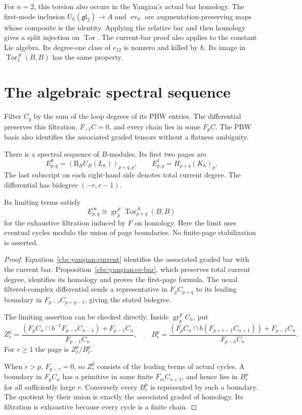 For $n=2$, this torsion also occurs in the Yangian's actual bar homology.
The first-mode inclusion
$U_\hbar(\mathfrak{gl}_2)\longrightarrow A$ and
$\operatorname{ev}_0$ are augmentation-preserving maps whose composite
is the identity.  Applying the relative bar and then homology gives
a split injection on $\operatorname{Tor}$.  The current-bar proof also
applies to the constant Lie algebra.  Its degree-one class of $e_{12}$
is nonzero and killed by $\hbar$.  Its image in
$\operatorname{Tor}^A_1(B,B)$ has the same property.

\section{The algebraic spectral sequence}

Filter $C_q$ by the sum of the loop degrees of its PBW entries.
The differential preserves this filtration, $F_{-1}C=0$, and every
chain lies in some $F_pC$.  The PBW basis also identifies the associated
graded tensors without a flatness ambiguity.

\begin{theorem}\label{thm:yangian-bar-ss}
There is a spectral sequence of $B$-modules.  Its first two pages are
\[
 E^0_{p,q}=(\mathrm B_B U_B(L_\hbar))_{p+q,p},\qquad
 E^1_{p,q}=H_{p+q}(K_\hbar)_p.
\]
The last subscript on each right-hand side denotes total current degree.
The differential has bidegree $(-r,r-1)$.

Its limiting terms satisfy
\[
 E^\infty_{p,q}
 \cong\operatorname{gr}^F_p\operatorname{Tor}^A_{p+q}(B,B)
\]
for the exhaustive filtration induced by $F$ on homology.
Here the limit uses eventual cycles modulo the union of page boundaries.
No finite-page stabilization is asserted.
\end{theorem}
\begin{proof}
Equation~\eqref{cbc:yangian:current} identifies the associated graded
bar with the current bar.  Proposition~\ref{cbc:yangian:ce-bar}, which
preserves total current degree, identifies its homology and proves the
first-page formula.  The usual filtered-complex differential sends a
representative in $F_pC_{p+q}$ to its leading boundary in
$F_{p-r}C_{p+q-1}$, giving the stated bidegree.

The limiting assertion can be checked directly.  Inside
$\operatorname{gr}_p^F C_n$, put
\[
 Z_r^p=\frac{(F_pC_n\cap b^{-1}F_{p-r}C_{n-1})+F_{p-1}C_n}
                  {F_{p-1}C_n},\qquad
 B_r^p=\frac{(F_pC_n\cap b(F_{p+r-1}C_{n+1}))+F_{p-1}C_n}
                  {F_{p-1}C_n}.
\]
For $r\geq1$ the page is $Z_r^p/B_r^p$.

When $r>p$, $F_{p-r}=0$, so $Z_r^p$ consists of the leading terms of
actual cycles.  A boundary in $F_pC_n$ has a primitive in some finite
$F_mC_{n+1}$, and hence lies in $B_r^p$ for all sufficiently large $r$.
Conversely every $B_r^p$ is represented by such a boundary.
The quotient by their union is exactly the associated graded of
homology.  Its filtration is exhaustive because every cycle is a
finite chain.
\end{proof}

